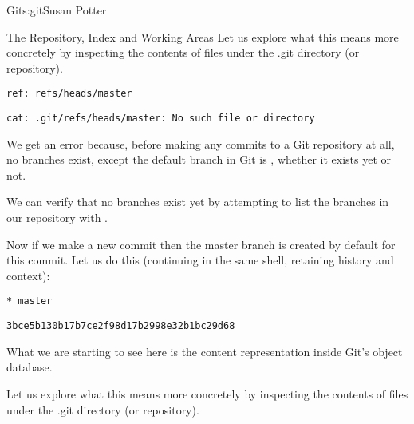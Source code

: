 \begin{aosachapter}{Git}{s:git}{Susan Potter}
\begin{aosasect1}{The Repository, Index and Working Areas}
Let us explore what this means more concretely by inspecting the contents of
files under the .git directory (or repository).

\begin{aosaitemize}
  \item {}
  \item {}
\begin{verbatim}
ref: refs/heads/master
\end{verbatim}
  \item {}
  \item {}
\begin{verbatim}
cat: .git/refs/heads/master: No such file or directory
\end{verbatim}
\end{aosaitemize}

We get an error because, before making any commits to a Git repository at
all, no branches exist, except the default branch in Git is ,
whether it exists yet or not.

We can verify that no branches exist yet by attempting to list the branches
in our repository with .

Now if we make a new commit then the master branch is created by default for
this commit. Let us do this (continuing in the same shell, retaining
history and context):

\begin{aosaitemize}
  \item {}
  \item {}
\begin{verbatim}
* master
\end{verbatim}
  \item {}
\begin{verbatim}
3bce5b130b17b7ce2f98d17b2998e32b1bc29d68
\end{verbatim}
  \item {}
\end{aosaitemize}

What we are starting to see here is the content representation inside Git's
object database.

Let us explore what this means more concretely by inspecting the contents of
files under the .git directory (or repository).


\end{aosasect1}
\end{aosachapter}

